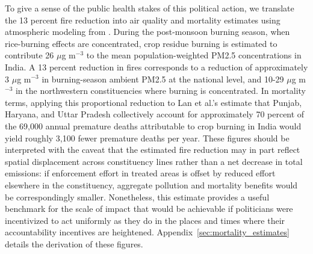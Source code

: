 \documentclass[12pt]{article}
\begin{document}
To give a sense of the public health stakes of this political action, we translate the 13 percent fire reduction into air quality and mortality estimates using atmospheric modeling from \citet{lan2022air}. During the post-monsoon burning season, when rice-burning effects are concentrated, crop residue burning is estimated to contribute 26 $\mu$g m$^{-3}$ to the mean population-weighted PM2.5 concentrations in India. A 13 percent reduction in fires corresponds to a reduction of approximately 3 $\mu$g m$^{-3}$ in burning-season ambient PM2.5 at the national level, and 10-29 $\mu$g m$^{-3}$ in the northwestern constituencies where burning is concentrated. In mortality terms, applying this proportional reduction to Lan et al.'s estimate that Punjab, Haryana, and Uttar Pradesh collectively account for approximately 70 percent of the 69,000 annual premature deaths attributable to crop burning in India would yield roughly 3,100 fewer premature deaths per year. These figures should be interpreted with the caveat that the estimated fire reduction may in part reflect spatial displacement across constituency lines rather than a net decrease in total emissions: if enforcement effort in treated areas is offset by reduced effort elsewhere in the constituency, aggregate pollution and mortality benefits would be correspondingly smaller. Nonetheless, this estimate provides a useful benchmark for the scale of impact that would be achievable if politicians were incentivized to act uniformly as they do in the places and times where their accountability incentives are heightened. Appendix~\ref{sec:mortality_estimates} details the derivation of these figures.

\end{document}
